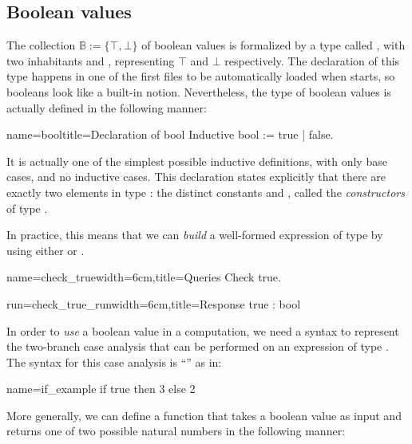 \subsection{Boolean values}\label{ssec:boolval}

The collection $\mathbb{B} := \{\top, \bot\}$ of boolean values is
formalized by a type called , with two inhabitants 
and , representing $\top$ and $\bot$ respectively. The
declaration of this type happens
in one of the first files to be automatically loaded when \Coq{} starts,
so booleans look like a built-in notion.  Nevertheless, the type of
boolean values is actually defined in the following manner:

\begin{coq}{name=bool}{title=Declaration of bool}
Inductive bool := true | false.
\end{coq}

It is actually one of the simplest possible inductive definitions,
with only base cases, and no inductive cases. This
declaration states explicitly that there are exactly two
elements in type : the distinct constants  and ,
called the \emph{constructors} of type .



In practice, this means that we can \emph{build} a well-formed expression of
type  by using either  or .

\begin{coq-left}{name=check_true}{width=6cm,title=Queries}
Check true.
\end{coq-left}
\begin{coqout-right}{run=check_true_run}{width=6cm,title=Response}
true : bool
\end{coqout-right}

In order to \emph{use} a boolean value in a computation, we need a
syntax to represent the two-branch case analysis that can be performed
on an expression of type . The \Coq{} syntax for this case analysis is
``'' as in:

\begin{coq}{name=if_example}{}
if true then 3 else 2
\end{coq}
More generally, we can define a function that takes a boolean value as
input and returns one of two possible natural numbers in the following
manner:

